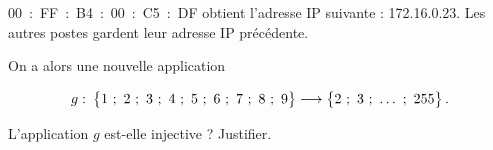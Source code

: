 \begin{exercice}[]
\begin{enumerate}
              00~:~FF~:~B4~:~00~:~C5~:~DF obtient l'adresse IP suivante : 172.16.0.23. Les autres postes gardent leur adresse IP précédente.

              On a alors une nouvelle application


              \[g : \:\left\lbrace 1~;~2~;~3~;~4~;~5~;~6~;~7~;~8~;~9\rule{0pt}{9pt}\right\rbrace \longrightarrow\left\lbrace 2~;~3~;~\ldots~;~255\rule{0pt}{9pt}\right\rbrace.\]

              L'application $g$  est-elle injective ? Justifier.
    \end{enumerate}
\end{exercice}